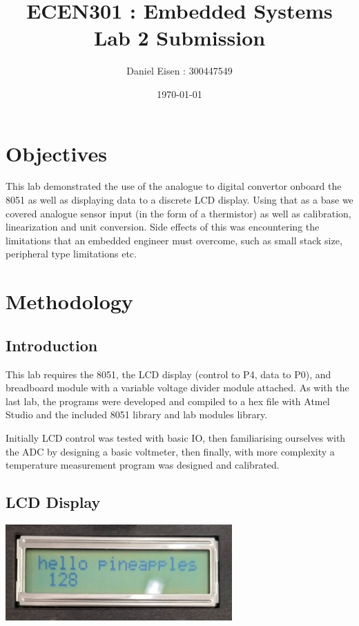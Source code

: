 \documentclass[11pt]{article}
\title{ECEN301 : Embedded Systems \\ Lab 2 Submission}
\author{Daniel Eisen : 300447549}
\date{\today}
\begin{document}
\begin{preview}
\maketitle
\section{Objectives}
This lab demonstrated the use of the analogue to digital convertor onboard the 8051 as well as displaying data to a discrete LCD display. Using that as a base we covered analogue sensor input (in the form of a thermistor) as well as calibration, linearization and unit conversion. Side effects of this was encountering the limitations that an embedded engineer must overcome, such as small stack size, peripheral type limitations etc.     

\section{Methodology}
        \subsection{Introduction}
        This lab requires the 8051, the LCD display (control to P4, data to P0), and breadboard module with a variable voltage divider module attached. As with the last lab, the programs were developed and compiled to a hex file with Atmel Studio and the included 8051 library and lab modules library.
        
        Initially LCD control was tested with basic IO, then familiarising ourselves with the ADC by designing a basic voltmeter, then finally, with more complexity a temperature measurement program was designed and calibrated.   

        \subsection{LCD Display}
        \begin{center}
                \includegraphics[width=0.65\textwidth]{res/LCD0.jpg}


\end{center}
\end{preview}
\end{document}
